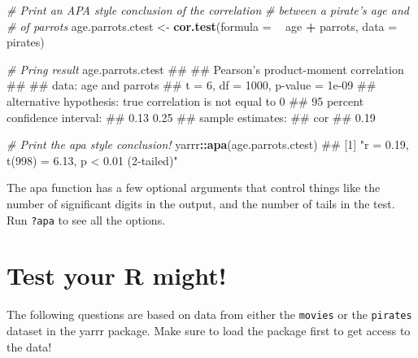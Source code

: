 \documentclass[]{book}
\newenvironment{Shaded}{\begin{snugshade}}{\end{snugshade}}
\newcommand{\KeywordTok}[1]{\textcolor[rgb]{0.13,0.29,0.53}{\textbf{#1}}}
\newcommand{\DataTypeTok}[1]{\textcolor[rgb]{0.13,0.29,0.53}{#1}}
\newcommand{\StringTok}[1]{\textcolor[rgb]{0.31,0.60,0.02}{#1}}
\newcommand{\CommentTok}[1]{\textcolor[rgb]{0.56,0.35,0.01}{\textit{#1}}}
\newcommand{\OperatorTok}[1]{\textcolor[rgb]{0.81,0.36,0.00}{\textbf{#1}}}
\newcommand{\NormalTok}[1]{#1}
\theoremstyle{definition}
\theoremstyle{definition}
\theoremstyle{remark}
\begin{document}
\begin{Shaded}
\begin{Highlighting}[]
\CommentTok{# Print an APA style conclusion of the correlation}
\CommentTok{#  between a pirate's age and # of parrots}
\NormalTok{age.parrots.ctest <-}\StringTok{ }\KeywordTok{cor.test}\NormalTok{(}\DataTypeTok{formula =} \OperatorTok{~}\StringTok{ }\NormalTok{age }\OperatorTok{+}\StringTok{ }\NormalTok{parrots,}
                              \DataTypeTok{data =}\NormalTok{ pirates)}

\CommentTok{# Pring result}
\NormalTok{age.parrots.ctest}
\NormalTok{## }
\NormalTok{##  Pearson's product-moment correlation}
\NormalTok{## }
\NormalTok{## data:  age and parrots}
\NormalTok{## t = 6, df = 1000, p-value = 1e-09}
\NormalTok{## alternative hypothesis: true correlation is not equal to 0}
\NormalTok{## 95 percent confidence interval:}
\NormalTok{##  0.13 0.25}
\NormalTok{## sample estimates:}
\NormalTok{##  cor }
\NormalTok{## 0.19}

\CommentTok{# Print the apa style conclusion!}
\NormalTok{yarrr}\OperatorTok{::}\KeywordTok{apa}\NormalTok{(age.parrots.ctest)}
\NormalTok{## [1] "r = 0.19, t(998) = 6.13, p < 0.01 (2-tailed)"}
\end{Highlighting}
\end{Shaded}

The apa function has a few optional arguments that control things like
the number of significant digits in the output, and the number of tails
in the test. Run \texttt{?apa} to see all the options.

\section{Test your R might!}\label{test-your-r-might-4}

The following questions are based on data from either the
\texttt{movies} or the \texttt{pirates} dataset in the yarrr package.
Make sure to load the package first to get access to the data!
\end{document}
